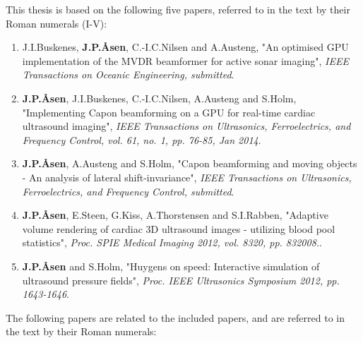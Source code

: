 \documentclass[10pt,b5paper,twoside]{book}
\begin{document}
This thesis is based on the following five papers, referred to in the text by their Roman numerals (I-V): 
\begin{enumerate}[I]
\renewcommand\labelenumi{\bfseries\theenumi}
	\item J.\:I.\:Buskenes, \textbf{J.\:P.\:\AA{}sen}, C.-I.\:C.\:Nilsen and A.\:Austeng, "An optimised GPU implementation of the MVDR beamformer for active sonar imaging", {\it  IEEE Transactions on Oceanic Engineering, submitted}.
	\item \textbf{J.\:P.\:\AA{}sen}, J.\:I.\:Buskenes, C.-I.\:C.\:Nilsen, A.\:Austeng and S.\:Holm, "Implementing Capon beamforming on a GPU for real-time cardiac ultrasound imaging", {\it IEEE Transactions on Ultrasonics, Ferroelectrics, and Frequency Control, vol. 61, no. 1, pp. 76-85, Jan 2014}.
 	\item \textbf{J.\:P.\:\AA{}sen}, A.\:Austeng and S.\:Holm, "Capon beamforming and moving objects - An analysis of lateral shift-invariance", {\it IEEE Transactions on Ultrasonics, Ferroelectrics, and Frequency Control, submitted}.
	\item \textbf{J.\:P.\:\AA{}sen}, E.\:Steen, G.\:Kiss, A.\:Thorstensen and S.\:I.\:Rabben, "Adaptive volume rendering of cardiac 3D ultrasound images - utilizing blood pool statistics", {\it Proc. SPIE Medical Imaging 2012, vol. 8320, pp. 832008.}.
	\item \textbf{J.\:P.\:\AA{}sen} and S.\:Holm, "Huygens on speed: Interactive simulation of ultrasound pressure fields", {\it Proc. IEEE Ultrasonics Symposium 2012, pp. 1643-1646}.
\end{enumerate}  

The following papers are related to the included papers, and are referred to in the text by their Roman numerals: 
\end{document}
